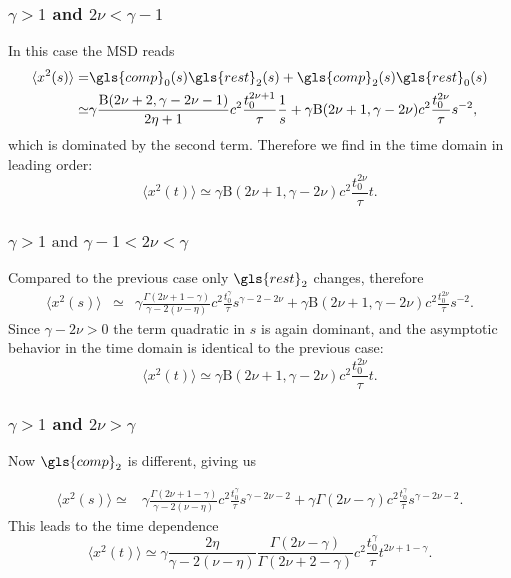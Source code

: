 \subsubsection{$\gamma>1$ and $2\nu < \gamma-1$}
In this case the MSD reads
\begin{align}
\langle x^2(s) \rangle =& \gls{comp}_0(s) \gls{rest}_2(s) + \gls{comp}_2(s)  \gls{rest}_0(s) \nonumber \\
 \simeq & \gamma \frac{\mathrm{B}(2\nu +2, \gamma - 2\nu -1)}{2\eta+1} c^2 \frac{t_0^{2\nu+1}}{\tau}\frac{1} {s}   + \gamma \mathrm{B}(2\nu+1,\gamma-2\nu) c^2 \frac{t_0^{2\nu}}{\tau}  s^{-2} \nonumber ,
\end{align}
which is dominated by the second term. Therefore we find in the time domain in leading order:
\begin{equation}
\langle x^2(t) \rangle \simeq \gamma \mathrm{B}(2\nu+1,\gamma-2\nu) c^2 \frac{ t_0^{2\nu}}{\tau}  t.
\end{equation}

\subsubsection{$\gamma>1 \text{ and }  \gamma-1 <2\nu < \gamma$}
Compared to the previous case only $\gls{rest}_2$ changes, therefore
\begin{align}
\langle x^2(s) \rangle &\simeq & \gamma \frac{\Gamma(2\nu+1-\gamma)}{\gamma - 2(\nu-\eta)} c^2\frac{t_0^{\gamma}}{\tau}  s^{\gamma-2-2\nu}  + \gamma \mathrm{B}(2\nu+1,\gamma-2\nu) c^2\frac{t_0^{2\nu}}{\tau}  s^{-2} .
\end{align}
Since $\gamma-2\nu>0$ the term quadratic in $s$ is again dominant, and the asymptotic behavior in the time domain is identical to the previous case:
\begin{equation}
\langle x^2(t) \rangle \simeq   \gamma \mathrm{B}(2\nu+1,\gamma-2\nu) c^2
\frac{t_0^{2\nu}}{\tau}  t.
\end{equation}

\subsubsection{$\gamma>1$ and $2\nu > \gamma$}
Now $\gls{comp}_2$ is different, giving us 

\begin{align}
\langle x^2(s) \rangle \simeq & \gamma \frac{\Gamma(2\nu+1-\gamma)}{\gamma - 2(\nu-\eta)} c^2 \frac{t_0^{\gamma}}{\tau}  s^{\gamma-2\nu-2} + \gamma \Gamma(2\nu-\gamma) c^2\frac {t_0^{\gamma}}{\tau}  s^{\gamma-2\nu-2}. 
\end{align}
This leads to the time dependence 
\begin{equation}
\langle x^2(t) \rangle \simeq \gamma   \frac{2 \eta }{\gamma - 2(\nu-\eta) } \frac{\Gamma(2\nu-\gamma)}{\Gamma(2\nu + 2-\gamma)} c^2  \frac{t_0^{\gamma}}{\tau } t^{2\nu+1-\gamma}.
\end{equation}

